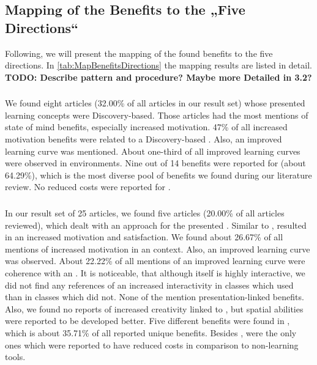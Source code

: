 \subsection{Mapping of the Benefits to the „Five Directions“}
\label{subsec:Mapping}
Following, we will present the mapping of the found benefits to the five directions. In \ref{tab:MapBenefitsDirections} the mapping results are listed in detail. \\
\textbf{TODO: Describe pattern and procedure? Maybe more Detailed in 3.2?}

\subsubsection{\DBLns}
We found eight articles (32.00\% of all articles in our result set) whose presented learning concepts were Discovery-based. Those articles had the most mentions of state of mind benefits, especially increased motivation. 47\% of all increased motivation benefits were related to a Discovery-based \AR \appns. Also, an improved learning curve was mentioned. About one-third of all improved learning curves were observed in \DBL environments. Nine out of 14 benefits were reported for \DBL \apps (about 64.29\%), which is the most diverse pool of benefits we found during our literature review. No reduced costs were reported for \DBL \appsns.

\subsubsection{\OMns}
In our result set of 25 articles, we found five articles (20.00\% of all articles reviewed), which dealt with an \OM approach for the presented \AR \appns. Similar to \DBL \appsns, \OM resulted in an increased motivation and satisfaction. We found about 26.67\% of all mentions of increased motivation in an \OM context. Also, an improved learning curve was observed. About 22.22\% of all mentions of an improved learning curve were coherence with an \OM \appns. It is noticeable, that although \OM itself is highly interactive, we did not find any references of an increased interactivity in classes which used \AR than in classes which did not. None of the \OM \apps mention presentation-linked benefits. Also, we found no reports of increased creativity linked to \OM, but spatial abilities were reported to be developed better. Five different benefits were found in \OM \appsns, which is about 35.71\% of all reported unique benefits. Besides \ST \appsns, \OM \apps were the only ones which were reported to have reduced costs in comparison to non-\AR learning tools.


